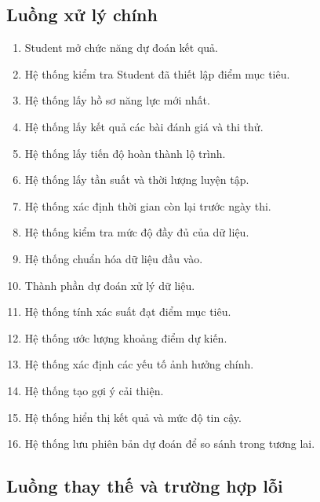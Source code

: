 \subsection{Luồng xử lý chính}

\begin{enumerate}
	\item Student mở chức năng dự đoán kết quả.
	
	\item Hệ thống kiểm tra Student đã thiết lập điểm mục tiêu.
	
	\item Hệ thống lấy hồ sơ năng lực mới nhất.
	
	\item Hệ thống lấy kết quả các bài đánh giá và thi thử.
	
	\item Hệ thống lấy tiến độ hoàn thành lộ trình.
	
	\item Hệ thống lấy tần suất và thời lượng luyện tập.
	
	\item Hệ thống xác định thời gian còn lại trước ngày thi.
	
	\item Hệ thống kiểm tra mức độ đầy đủ của dữ liệu.
	
	\item Hệ thống chuẩn hóa dữ liệu đầu vào.
	
	\item Thành phần dự đoán xử lý dữ liệu.
	
	\item Hệ thống tính xác suất đạt điểm mục tiêu.
	
	\item Hệ thống ước lượng khoảng điểm dự kiến.
	
	\item Hệ thống xác định các yếu tố ảnh hưởng chính.
	
	\item Hệ thống tạo gợi ý cải thiện.
	
	\item Hệ thống hiển thị kết quả và mức độ tin cậy.
	
	\item Hệ thống lưu phiên bản dự đoán để so sánh trong tương lai.
\end{enumerate}

\subsection{Luồng thay thế và trường hợp lỗi}

